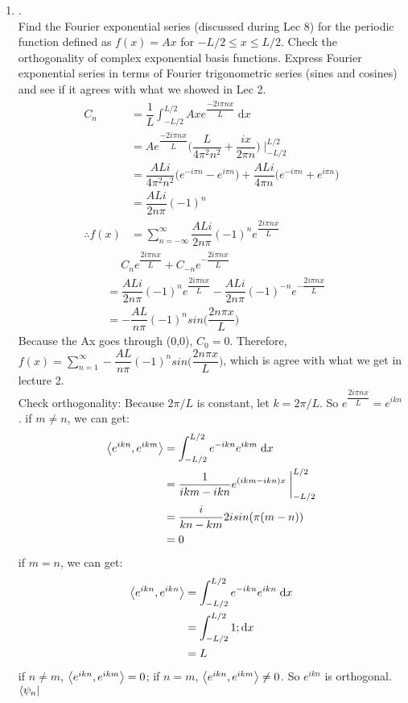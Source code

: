 \documentclass{article}
\providecommand{\bigp}[1]{\bigg( #1 \bigg)}
\theoremstyle{definition}
\theoremstyle{plain}
\begin{document}
\begin {enumerate}[itemindent=30pt,label=\bf Exercise {\arabic*}:]
\subitem 
\item .\\Find the Fourier exponential series (discussed during Lec 8) for the periodic function defined as $f(x)=Ax$ for $−L/2\leq x \leq L/2$. Check the orthogonality of complex exponential basis functions. Express Fourier exponential series in terms of Fourier trigonometric series (sines and cosines) and see if it agrees with what we showed in Lec 2.
\begin{align*}
	C_{n} &= \dfrac{1}{L}\int_{-L/2}^{L/2} Ax e^{\dfrac{-2i \pi n x}{L}}\;\mathrm{d}x \\
		  &= A e^{\dfrac{-2i \pi n x}{L}} \bigp{ \dfrac{L}{4 \pi^{2} n^{2}}  + \dfrac{ix}{2\pi n}} \;\bigg|_{-L/2}^{L/2}\\
		  &= \dfrac{ALi}{4\pi^{2} n^{2}} \big( e^{-i\pi n} - e^{i\pi n} \big) + \dfrac{ALi}{4 \pi n} \big( e^{-i\pi n} + e^{i\pi n} \big) \\
		  &= \dfrac{ALi}{2n\pi} (-1)^{n} \\
	\therefore f(x) &= \sum \limits_{n = - \infty}^{\infty} \dfrac{ALi}{2n\pi} (-1)^{n}  e^{\dfrac{2i\pi n x}{L}} 
\end{align*}
\begin{align*}
	&\quad\;C_{n}e^{\dfrac{2i\pi n x}{L}} + C_{-n}e^{-\dfrac{2i\pi n x}{L}} \\
	&=\dfrac{ALi}{2n\pi} (-1)^{n} e^{\dfrac{2i\pi n x}{L}} - \dfrac{ALi}{2n\pi} (-1)^{-n} e^{-\dfrac{2i\pi n x}{L}}\\
	&=-\dfrac{AL}{n\pi} (-1)^{n} sin \bigp{\dfrac{2n\pi x}{L}}
\end{align*}
\subitem Because the Ax goes through (0,0), $C_{0} = 0$. Therefore, $ f(x) = \sum \limits_{n = 1}^{\infty} -\dfrac{AL}{n\pi} (-1)^{n} sin \bigp{\dfrac{2n\pi x}{L}}$, which is agree with what we get in lecture 2.\\
\subitem Check orthogonality:
\subitem Because $2\pi / L$ is constant, let $k = 2\pi / L$. So 
$e^{\dfrac{2i\pi n x}{L}} = e^{ikn}$. if $m \neq n$, we can get:
\begin{align*}
	\Braket{e^{ikn}, e^{ikm}} &= \int_{-L/2}^{L/2} e^{-ikn}e^{ikm}\; \mathrm{d}x\\
	&= \dfrac{1}{ikm - ikn} e^{(ikm - ikn)x}\; \bigg|_{-L/2}^{L/2}\\
	&= \dfrac{i}{kn-km} 2 i sin(\pi(m-n))\\
	&= 0
\end{align*}
\subitem if $m = n$, we can get:
\begin{align*}
	\Braket{e^{ikn}, e^{ikn}} &= \int_{-L/2}^{L/2} e^{-ikn}e^{ikn}\; \mathrm{d}x\\
	&= \int_{-L/2}^{L/2} 1; \mathrm{d}x\\
	&= L
\end{align*}
\subitem if $n \neq m$, $\Braket{e^{ikn}, e^{ikm}} = 0$; if $n = m$, $\Braket{e^{ikn}, e^{ikm}} \neq 0$. So $e^{ikn}$ is orthogonal.
\subitem $\Bra{\psi_{n}}$
\end{enumerate}
\end{document}
